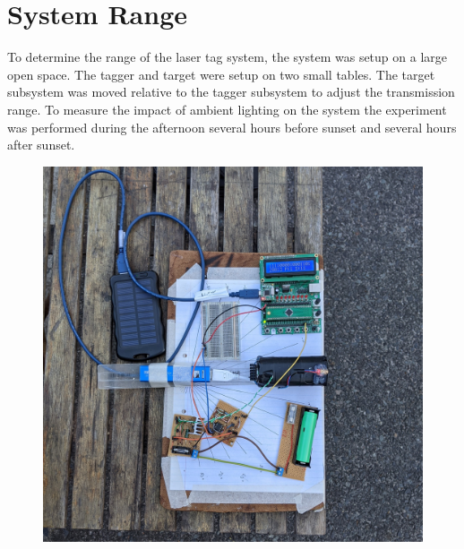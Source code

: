 \section{System Range}

To determine the range of the laser tag system, the system was setup on a large open space. The tagger and target were setup on two small tables. The target subsystem was moved relative to the tagger subsystem to adjust the transmission range. To measure the impact of ambient lighting  on the system the experiment was performed during the afternoon several hours before sunset and several hours after sunset.

\begin{figure}[H]
	\centering
	\begin{minipage}{.48\textwidth}
		\centering
		\includegraphics[width=.9\linewidth]{figures/experimentation/transmitter_setup_irl_crop.jpg}
		\label{fig:transmitter_setup_irl}
	\end{minipage}%
	\hfill
	\begin{minipage}{.48\textwidth}
		\centering

\end{minipage}
\end{figure}
